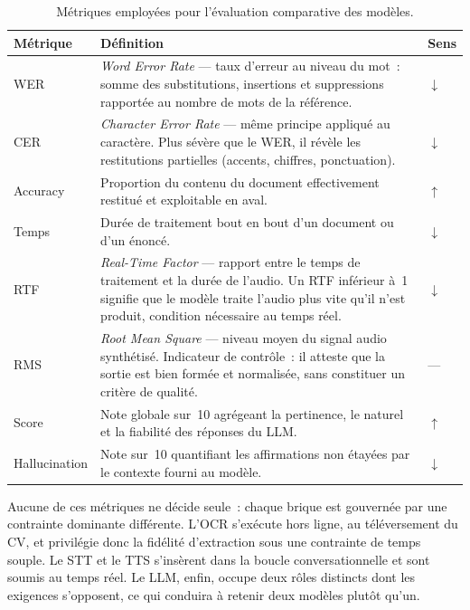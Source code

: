 \begin{table}[H]
  \centering
  \footnotesize
  \renewcommand{\arraystretch}{1.25}
  \setlength{\tabcolsep}{6pt}
  \begin{tabularx}{\textwidth}{|>{\raggedright\arraybackslash}p{1.8cm}|>{\raggedright\arraybackslash}X|>{\centering\arraybackslash}p{1.3cm}|}
    \hline
    \rowcolor{blue!10}
    \textbf{Métrique} & \textbf{Définition} & \textbf{Sens} \\
    \hline
    WER & \textit{Word Error Rate} --- taux d'erreur au niveau du mot~: somme des substitutions, insertions et suppressions rapportée au nombre de mots de la référence. & $\downarrow$ \\ \hline
    CER & \textit{Character Error Rate} --- même principe appliqué au caractère. Plus sévère que le WER, il révèle les restitutions partielles (accents, chiffres, ponctuation). & $\downarrow$ \\ \hline
    Accuracy & Proportion du contenu du document effectivement restitué et exploitable en aval. & $\uparrow$ \\ \hline
    Temps & Durée de traitement bout en bout d'un document ou d'un énoncé. & $\downarrow$ \\ \hline
    RTF & \textit{Real-Time Factor} --- rapport entre le temps de traitement et la durée de l'audio. Un RTF inférieur à~1 signifie que le modèle traite l'audio plus vite qu'il n'est produit, condition nécessaire au temps réel. & $\downarrow$ \\ \hline
    RMS & \textit{Root Mean Square} --- niveau moyen du signal audio synthétisé. Indicateur de contrôle~: il atteste que la sortie est bien formée et normalisée, sans constituer un critère de qualité. & --- \\ \hline
    Score & Note globale sur~10 agrégeant la pertinence, le naturel et la fiabilité des réponses du LLM. & $\uparrow$ \\ \hline
    Hallucination & Note sur~10 quantifiant les affirmations non étayées par le contexte fourni au modèle. & $\downarrow$ \\ \hline
  \end{tabularx}
  \caption{Métriques employées pour l'évaluation comparative des modèles.}
  \label{tab:bench-metrics}
\end{table}

Aucune de ces métriques ne décide seule~: chaque brique est gouvernée par une contrainte
dominante différente. L'OCR s'exécute hors ligne, au téléversement du CV, et privilégie donc la
fidélité d'extraction sous une contrainte de temps souple. Le STT et le TTS s'insèrent dans la
boucle conversationnelle et sont soumis au temps réel. Le LLM, enfin, occupe deux rôles distincts
dont les exigences s'opposent, ce qui conduira à retenir deux modèles plutôt qu'un.

